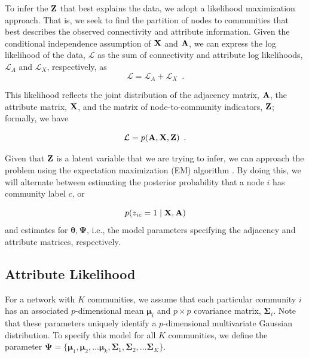 To infer the ${\bf Z}$ that best explains the data, we adopt a likelihood maximization approach. That is, we seek to find the partition of nodes to communities that best describes the observed connectivity and attribute information.  Given the conditional independence assumption of ${\bf X}$ and ${\bf A}$, we can express the log likelihood of the data, ${\mathcal L}$ as the sum of connectivity and attribute log likelihoods, ${\mathcal L}_{A}$ and ${\mathcal L}_{X}$, respectively,
as
\begin{equation}
\mathcal{L}=\mathcal{L}_{A}+\mathcal{L}_{X}\enspace.
\label{eqn:likelihood_decomposition}
\end{equation}

This likelihood reflects the joint distribution of the adjacency matrix, ${\bf A}$, the attribute matrix, ${\bf X}$, and the matrix of node-to-community indicators, ${\bf Z}$; formally, we have 

\begin{equation}
\mathcal{L}=p({\bf A},{\bf X},{\bf Z})\enspace. 
\end{equation}

Given that ${\bf Z}$ is a latent variable that we are trying to infer, we can approach the problem using the expectation maximization (EM) algorithm \cite{dempster}. By doing this, we will alternate between estimating the posterior probability that a node $i$ has community label $c$, or

\begin{equation}
\label{post}
p(z_{ic}=1\mid {\bf X,A})
\end{equation} 
and estimates for ${\boldsymbol \theta, \boldsymbol \Psi}$, i.e., the model parameters specifying the adjacency and attribute matrices, respectively. 

\subsection{Attribute Likelihood}

For a network with $K$ communities, we assume that each particular community $i$ has an associated $p$-dimensional mean ${\boldsymbol \mu}_{i}$ and $p \times p$ covariance matrix, ${\boldsymbol \Sigma}_{i}$. Note that these parameters uniquely identify a $p$-dimensional multivariate Gaussian distribution. To specify this model for all $K$ communities, we define the parameter ${\boldsymbol \Psi}=\{{\boldsymbol \mu}_{1},{\boldsymbol \mu}_{2},\dots {\boldsymbol \mu}_{k},{\boldsymbol \Sigma}_{1},{\boldsymbol \Sigma}_{2},\dots {\boldsymbol \Sigma}_{K}\}$. 


